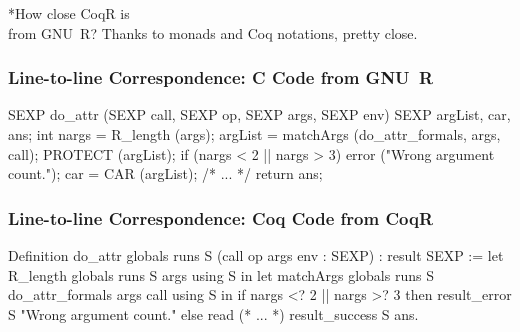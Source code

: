 \documentclass{beamer}
\begin{document}
\sectionframe**{How close CoqR is\\from GNU~R?}{
    \vfill
    \centering{}
    \textcolor{DarkPlum}{Thanks to monads and Coq notations, pretty close.}
}

\begin{frame}[fragile]
    \frametitle{Line-to-line Correspondence: C Code from GNU~R}

\begin{changemargin}{-5mm}{-5mm}
\begin{ccode}
SEXP do_attr
    (SEXP call, SEXP op, SEXP args, SEXP env){
  SEXP argList, car, ans;
  int nargs = R_length (args);
  argList =
    matchArgs (do_attr_formals, args, call);
  PROTECT (argList);
  if (nargs < 2 || nargs > 3)
    error ("Wrong argument count.");
  car = CAR (argList);
  /* ... */
  return ans;
}
\end{ccode}
\end{changemargin}

\end{frame}

\begin{frame}[fragile]
    \frametitle{Line-to-line Correspondence: Coq Code from CoqR}

\begin{changemargin}{-5mm}{-5mm}
\begin{coqcode}
Definition do_attr globals runs S
    (call op args env : SEXP) : result SEXP :=
  let%
    R_length globals runs S args using S in
  let%
    matchArgs globals runs S
      do_attr_formals args call using S in
  if nargs <? 2 || nargs >? 3 then
    result_error S "Wrong argument count."
  else
    read%
    (* ... *)
    result_success S ans.
\end{coqcode}
\end{changemargin}

\end{frame}
\end{document}
